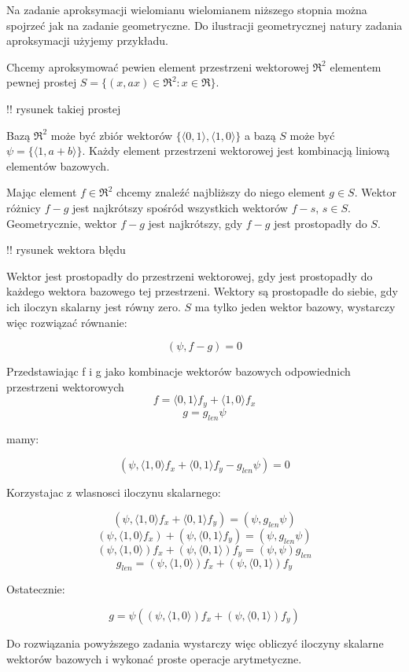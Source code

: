 \documentclass{article}
\begin{document}
Na zadanie aproksymacji wielomianu wielomianem niższego stopnia można spojrzeć jak na zadanie geometryczne. Do ilustracji geometrycznej natury zadania aproksymacji użyjemy przykładu.

Chcemy aproksymować pewien element przestrzeni wektorowej $\Re^2$ elementem pewnej prostej $S = \{ (x, ax) \in \Re^2 : x \in \Re \}$.

!! rysunek takiej prostej

Bazą $\Re^2$ może być zbiór wektorów $\{\langle 0, 1 \rangle, \langle 1, 0 \rangle \}$ a bazą $S$ może być $\psi = \{\langle 1, a + b\rangle \}$. Każdy element przestrzeni wektorowej jest kombinacją liniową elementów bazowych.

Mając element $f \in \Re^2$ chcemy znaleźć najbliższy do niego element $g \in S$. Wektor różnicy $f - g$ jest najkrótszy spośród wszystkich wektorów $f - s$, $s \in S$. Geometrycznie, wektor $f - g$ jest najkrótszy, gdy $f - g$ jest prostopadły do $S$.

!! rysunek wektora błędu

Wektor jest prostopadły do przestrzeni wektorowej, gdy jest prostopadły do każdego wektora bazowego tej przestrzeni. Wektory są prostopadłe do siebie, gdy ich iloczyn skalarny jest równy zero. $S$ ma tylko jeden wektor bazowy, wystarczy więc rozwiązać równanie:

$$(\psi, f - g) = 0$$

Przedstawiając f i g jako kombinacje wektorów bazowych odpowiednich przestrzeni wektorowych
$$f = \langle 0,1 \rangle f_y + \langle 1,0 \rangle f_x$$
$$g = g_{len} \psi$$

mamy:

$$(\psi, \langle 1,0 \rangle f_x + \langle 0,1 \rangle f_y - g_{len} \psi) = 0$$

Korzystajac z wlasnosci iloczynu skalarnego:

$$(\psi, \langle 1,0 \rangle f_x + \langle 0,1 \rangle f_y) = (\psi, g_{len} \psi)$$
$$(\psi, \langle 1,0 \rangle f_x) + (\psi, \langle 0,1 \rangle f_y) = (\psi, g_{len} \psi)$$
$$(\psi, \langle 1,0 \rangle) f_x + (\psi, \langle 0,1 \rangle) f_y = (\psi, \psi)g_{len}$$
$$g_{len} = (\psi, \langle 1,0 \rangle) f_x + (\psi, \langle 0,1 \rangle) f_y$$

Ostatecznie:

$$g = \psi ((\psi, \langle 1,0 \rangle) f_x + (\psi, \langle 0,1 \rangle) f_y)$$

Do rozwiązania powyższego zadania wystarczy więc obliczyć iloczyny skalarne wektorów bazowych i wykonać proste operacje arytmetyczne.
\end{document}
